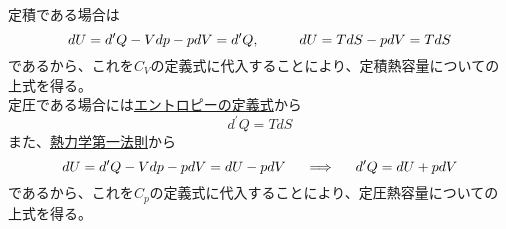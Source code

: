 \documentclass{jsarticle}
\begin{document}
定積である場合は
\begin{equation*}
    dU=d^{\prime}Q-Vdp-pdV=d^{\prime}Q,\hspace{10mm}dU=TdS-pdV=TdS
\end{equation*}
であるから、これを\(C_{V}\)の定義式に代入することにより、定積熱容量についての上式を得る。\\
定圧である場合には\hyperlink{エントロピー}{エントロピーの定義式}から
\begin{equation*}
    d^{\prime}Q=TdS
\end{equation*}
また、\hyperlink{熱力学第一法則}{熱力学第一法則}から
\begin{equation*}
    dU=d^{\prime}Q-Vdp-pdV=dU-pdV\hspace{5mm}\Longrightarrow\hspace{5mm}d^{\prime}Q=dU+pdV
\end{equation*}
であるから、これを\(C_{p}\)の定義式に代入することにより、定圧熱容量についての上式を得る。\\
\end{document}

